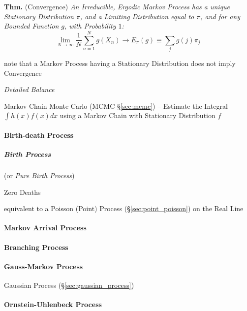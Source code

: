 \textbf{Thm.} (Convergence) \emph{
  An Irreducible, Ergodic Markov Process has a
  unique Stationary Distribution $\pi$, and a Limiting Distribution equal to
  $\pi$, and for any Bounded Function $g$, with Probability $1$:
\[
  \lim_{N\to\infty} \frac{1}{N} \sum_{n=1}^N g(X_n) \to E_\pi(g)
    \equiv \sum_j g(j) \pi_j
\]
}

note that a Markov Process having a Stationary Distribution does not imply
Convergence

\emph{Detailed Balance}

\fist Markov Chain Monte Carlo (MCMC \S\ref{sec:mcmc}) -- Estimate the Integral
$\int h(x) f(x) dx$ using a Markov Chain with Stationary Distribution $f$



\paragraph{Birth-death Process}\label{sec:birth_death}\hfill

\subparagraph{Birth Process}\label{sec:birth_process}\hfill

(or \emph{Pure Birth Process})

Zero Deaths

equivalent to a Poisson (Point) Process (\S\ref{sec:point_poisson}) on the Real
Line



\paragraph{Markov Arrival Process}\label{sec:markov_arrival_process}\hfill

\paragraph{Branching Process}\label{sec:branching_process}\hfill

\paragraph{Gauss-Markov Process}\label{sec:gauss_markov_process}\hfill

Gaussian Process (\S\ref{sec:gaussian_process})



\paragraph{Ornstein-Uhlenbeck Process}\label{sec:ornstein_uhlenbeck}\hfill

